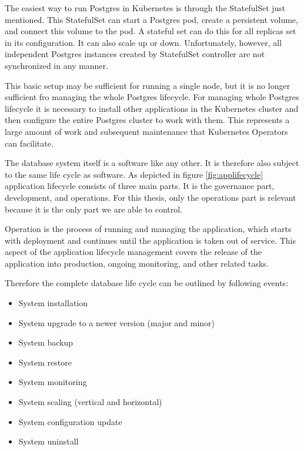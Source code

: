 The easiest way to run Postgres in Kubernetes is through the StatefulSet just mentioned. This StatefulSet can start a Postgres pod, create a persistent volume, and connect this volume to the pod. A stateful set can do this for all replicas set in its configuration. It can also scale up or down. Unfortunately, however, all independent Postgres instances created by StatefulSet controller are not synchronized in any manner.

This basic setup may be sufficient for running a single node, but it is no longer sufficient fro managing the whole Postgres lifecycle. For managing whole Postgres lifecycle it is necessary to install other applications in the Kubernetes cluster and then configure the entire Postgres cluster to work with them. This represents a large amount of work and subsequent maintenance that Kubernetes Operators can facilitate.

\label{chap:lifecycle}
The database system itself is a software like any other. It is therefore also subject to the same life cycle as software.
As depicted in figure \ref{fig:applifecycle} application lifecycle consists of three main parts. It is the governance part, development, and operations. For this thesis, only the operations part is relevant because it is the only part we are able to control.

Operation is the process of running and managing the application, which starts with deployment and continues until the application is taken out of service. This aspect of the application lifecycle management covers the release of the application into production, ongoing monitoring, and other related tasks. \cite{ALM}

Therefore the complete database life cycle can be outlined by following events:
\begin{itemize}
    \item System installation
    \item System upgrade to a newer version (major and minor)
    \item System backup
    \item System restore
    \item System monitoring
    \item System scaling (vertical and horizontal)
    \item System configuration update
    \item System uninstall
\end{itemize}

